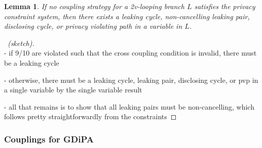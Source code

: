 \documentclass[12pt]{article}
\newtheorem{lemma}[thm]{Lemma}
\theoremstyle{definition}
\begin{document}
\begin{lemma}
    If no coupling strategy for a 2v-looping branch $L$ satisfies the privacy constraint system, then there exists a leaking cycle, non-cancelling leaking pair, disclosing cycle, or privacy violating path in a variable in $L$.
\end{lemma}
\begin{proof}[\proofname~(sketch)]~\\
    - if 9/10 are violated such that the cross coupling condition is invalid, there must be a leaking cycle
    
    - otherwise, there must be a leaking cycle, leaking pair, disclosing cycle, or pvp in a single variable by the single variable result

    - all that remains is to show that all leaking pairs must be non-cancelling, which follows pretty straightforwardly from the constraints
\end{proof}

\subsubsection{Couplings for GDiPA}
\end{document}
